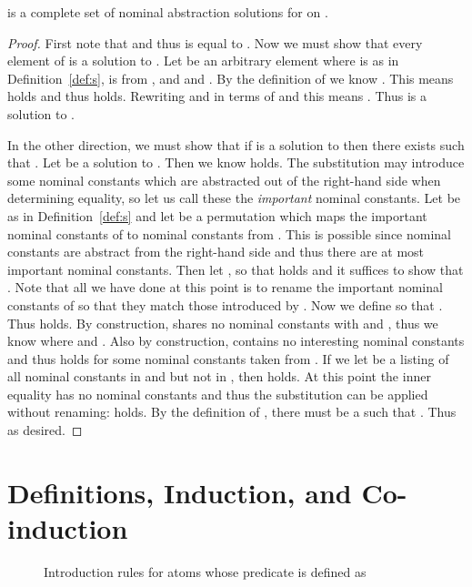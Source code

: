 \begin{theorem}
 is a complete set of nominal abstraction solutions
for  on .
\end{theorem}
\begin{proof}
First note that  and
thus  is equal to .
Now we must show that every element of  is a
solution to . Let 
be an arbitrary element where  is as in Definition~\ref{def:s},
 is from , and  and .  By the definition of  we know . This means  holds and thus  holds. Rewriting  and  in terms of  and  this
means . Thus 
is a solution to .

In the other direction, we must show that if  is a solution to  then there exists 
such that . Let  be a
solution to . Then we know  holds.
The substitution  may introduce some nominal constants which
are abstracted out of the right-hand side when determining equality, so
let us call these the {\em important} nominal constants. Let  be as in
Definition~\ref{def:s} and let  be a permutation which maps the
important nominal constants of  to nominal constants from
. This is possible since  nominal constants are
abstract from the right-hand side and thus there are at most 
important nominal constants. Then let , so that
 holds and it suffices to show that . Note that all we have done at this
point is to rename the important nominal constants of  so that
they match those introduced by . Now we define  so that
. Thus  holds. By construction,  shares no
nominal constants with  and , thus we know  where  and . Also by
construction,  contains no interesting nominal constants and
thus  holds for some nominal
constants  taken from . If we let
 be a listing of all nominal constants in  and  but
not in , then  holds. At this point the inner
equality has no nominal constants and thus the substitution  can
be applied without renaming:  holds. By the definition of
, there must be a  such that . Thus
 as desired.
\end{proof}

\section{Definitions, Induction, and Co-induction}
\label{sec:definitions}

\begin{figure}[t]
\begin{center}

\end{center}
\caption{Introduction rules for atoms whose predicate is defined as }
\label{fig:defrules}
\end{figure}


